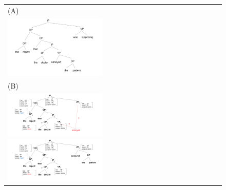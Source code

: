 \begin{figure}
    \centering
	\begin{tabular}{llll}
		(A) \\
		\includegraphics[width=0.5\textwidth]{figures/act-r-illustration-parsetree.pdf} \\
		(B) \\
		\includegraphics[width=0.5\textwidth]{figures/act-r-illustration-compatibility-cues.pdf} 
		\includegraphics[width=0.5\textwidth]{figures/act-r-illustration-compatibility2-cues.pdf} 
	\end{tabular}

\end{figure}
